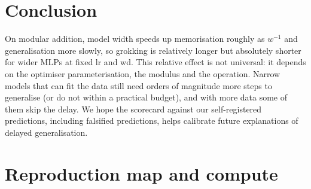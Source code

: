 \documentclass{article}
\begin{document}
\section{Conclusion}
On modular addition, model width speeds up memorisation roughly as $w^{-1}$ and generalisation more slowly, so grokking is relatively longer but absolutely shorter for wider MLPs at fixed lr and wd. This relative effect is not universal: it depends on the optimiser parameterisation, the modulus and the operation.
Narrow models that can fit the data still need orders of magnitude more steps to generalise (or do not within a practical budget), and with more data some of them skip the delay. We hope the scorecard against our self-registered predictions, including falsified predictions, helps calibrate future explanations of delayed generalisation.




\appendix
\section{Reproduction map and compute}\label{app:exp}


\newpage

\end{document}
